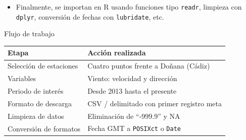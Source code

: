 \documentclass[
]{article}
\providecommand{\tightlist}{%
  \setlength{\itemsep}{0pt}\setlength{\parskip}{0pt}}
\begin{document}
\begin{itemize}
\tightlist
\item
  Finalmente, se importan en R usando funciones tipo \texttt{readr}, limpieza con \texttt{dplyr}, conversión de fechas con \texttt{lubridate}, etc.
\end{itemize}

Flujo de trabajo

\begin{longtable}[]{@{}
  >{\raggedright\arraybackslash}p{}
  >{\raggedright\arraybackslash}p{}@{}}
\toprule\noalign{}
\begin{minipage}[b]{\linewidth}\raggedright
Etapa
\end{minipage} & \begin{minipage}[b]{\linewidth}\raggedright
Acción realizada
\end{minipage} \\
\midrule\noalign{}
\endhead
\bottomrule\noalign{}
\endlastfoot
Selección de estaciones & Cuatro puntos frente a Doñana (Cádiz) \\
Variables & Viento: velocidad y dirección \\
Periodo de interés & Desde 2013 hasta el presente \\
Formato de descarga & CSV / delimitado con primer registro meta \\
Limpieza de datos & Eliminación de ``‑999.9'' y NA \\
Conversión de formatos & Fecha GMT a \texttt{POSIXct} o \texttt{Date} \\
\end{longtable}
\end{document}
